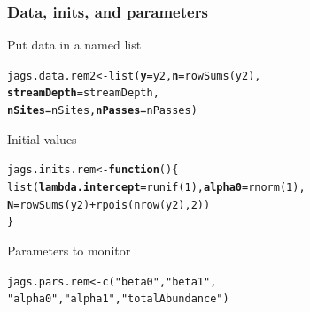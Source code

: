 \documentclass[color=usenames,dvipsnames]{beamer}\usepackage[]{graphicx}\usepackage[]{xcolor}
\makeatletter
\newcommand{\hlnum}[1]{\textcolor[rgb]{0.69,0.494,0}{#1}}%
\newcommand{\hlstr}[1]{\textcolor[rgb]{0.749,0.012,0.012}{#1}}%
\newcommand{\hlopt}[1]{\textcolor[rgb]{0,0,0}{#1}}%
\newcommand{\hlstd}[1]{\textcolor[rgb]{0,0,0}{#1}}%
\newcommand{\hlkwa}[1]{\textcolor[rgb]{0,0,0}{\textbf{#1}}}%
\newcommand{\hlkwb}[1]{\textcolor[rgb]{0,0.341,0.682}{#1}}%
\newcommand{\hlkwc}[1]{\textcolor[rgb]{0,0,0}{\textbf{#1}}}%
\newcommand{\hlkwd}[1]{\textcolor[rgb]{0.004,0.004,0.506}{#1}}%
\newenvironment{kframe}{%
 \def\at@end@of@kframe{}%
 \ifinner\ifhmode%
  \def\at@end@of@kframe{\end{minipage}}%
  \begin{minipage}{\columnwidth}%
 \fi\fi%
 \def\FrameCommand##1{\hskip\@totalleftmargin \hskip-\fboxsep
 \colorbox{shadecolor}{##1}\hskip-\fboxsep
     \hskip-\linewidth \hskip-\@totalleftmargin \hskip\columnwidth}%
 \MakeFramed {\advance\hsize-\width
   \@totalleftmargin\z@ \linewidth\hsize
   \@setminipage}}%
 {\par\unskip\endMakeFramed%
 \at@end@of@kframe}
\newenvironment{knitrout}{}{} %
\makeatother
\begin{document}
\begin{frame}[fragile]
  \frametitle{Data, inits, and parameters}
  Put data in a named list
  \vspace{-12pt}
\begin{knitrout}\small
{}\color{fgcolor}\begin{kframe}
\begin{alltt}
\hlstd{jags.data.rem2} \hlkwb{<-} \hlkwd{list}\hlstd{(}\hlkwc{y}\hlstd{=y2,} \hlkwc{n}\hlstd{=}\hlkwd{rowSums}\hlstd{(y2),}
                       \hlkwc{streamDepth}\hlstd{=streamDepth,}
                       \hlkwc{nSites}\hlstd{=nSites,} \hlkwc{nPasses}\hlstd{=nPasses)}
\end{alltt}
\end{kframe}
\end{knitrout}
\pause
\vfill
  Initial values
  \vspace{-12pt}
\begin{knitrout}\small
{}\color{fgcolor}\begin{kframe}
\begin{alltt}
\hlstd{jags.inits.rem} \hlkwb{<-} \hlkwa{function}\hlstd{() \{}
    \hlkwd{list}\hlstd{(}\hlkwc{lambda.intercept}\hlstd{=}\hlkwd{runif}\hlstd{(}\hlnum{1}\hlstd{),} \hlkwc{alpha0}\hlstd{=}\hlkwd{rnorm}\hlstd{(}\hlnum{1}\hlstd{),}
         \hlkwc{N}\hlstd{=}\hlkwd{rowSums}\hlstd{(y2)}\hlopt{+}\hlkwd{rpois}\hlstd{(}\hlkwd{nrow}\hlstd{(y2),} \hlnum{2}\hlstd{))}
\hlstd{\}}
\end{alltt}
\end{kframe}
\end{knitrout}
\pause
\vfill
  Parameters to monitor
  \vspace{-12pt}
\begin{knitrout}\small
{}\color{fgcolor}\begin{kframe}
\begin{alltt}
\hlstd{jags.pars.rem} \hlkwb{<-} \hlkwd{c}\hlstd{(}\hlstr{"beta0"}\hlstd{,} \hlstr{"beta1"}\hlstd{,}
                   \hlstr{"alpha0"}\hlstd{,} \hlstr{"alpha1"}\hlstd{,} \hlstr{"totalAbundance"}\hlstd{)}
\end{alltt}
\end{kframe}
\end{knitrout}
\end{frame}
\end{document}
